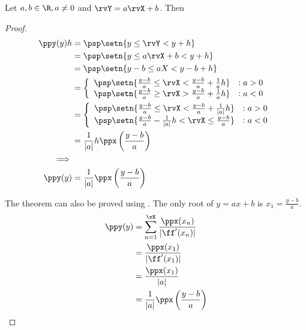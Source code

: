 \begin{proposition}
Let $a,b\in\R, a\ne 0$ and $\rvY=a\rvX+b$. Then
\end{proposition}
\begin{proof}
\begin{align*}
  \ppy(y)h
    &=  \psp\setn{y\le\rvY < y+h}
  \\&=  \psp\setn{y\le a\rvX+b < y+h}
  \\&=  \psp\setn{y-b\le aX < y-b+h}
  \\&=  \left\{\begin{array}{ll}
          \psp\setn{\frac{y-b}{a}\le\rvX < \frac{y-b}{a}+\frac{1}{a}h} &: a>0 \\
          \psp\setn{\frac{y-b}{a}\ge\rvX > \frac{y-b}{a}+\frac{1}{a}h} &: a<0
        \end{array}\right.
  \\&=  \left\{\begin{array}{ll}
          \psp\setn{\frac{y-b}{a}\le\rvX < \frac{y-b}{a}+\frac{1}{|a|}h} &: a>0 \\
          \psp\setn{\frac{y-b}{a}-\frac{1}{|a|}h <\rvX \le \frac{y-b}{a}} &: a<0
        \end{array}\right.
  \\&=  \frac{1}{|a|}h \ppx\left(\frac{y-b}{a}\right)
\\\implies
\\
  \ppy(y)
    &=  \frac{1}{|a|} \ppx\left(\frac{y-b}{a}\right)
\end{align*}

The theorem can also be proved using .
The only root of $y=ax+b$ is $x_1=\frac{y-b}{a}$.
\begin{align*}
  \ppy(y)
    &= \sum_{n=1}^{\xN} \frac{\ppx(x_n)}{|\ff'(x_n)|}
  \\&= \frac{\ppx(x_1)}{|\ff'(x_1)|}
  \\&= \frac{\ppx(x_1)}{|a|}
  \\&= \frac{1}{|a|}\ppx\left(\frac{y-b}{a}\right)
\end{align*}
\end{proof}

